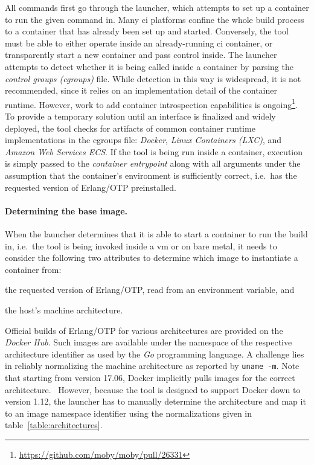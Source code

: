 All commands first go through the launcher, which attempts to set up a container to run the given command in. Many \acrshort{ci} platforms confine the whole build process to a container that has already been set up and started. Conversely, the tool must be able to either operate inside an already-running \acrshort{ci} container, or transparently start a new container and pass control inside. The launcher attempts to detect whether it is being called inside a container by parsing the \emph{control groups (cgroups)} file. While detection in this way is widespread, it is not recommended, since it relies on an implementation detail of the container runtime. However, work to add container introspection capabilities is ongoing\footnote{\url{https://github.com/moby/moby/pull/26331}}. To provide a temporary solution until an interface is finalized and widely deployed, the tool checks for artifacts of common container runtime implementations in the cgroups file: \emph{Docker}, \emph{Linux Containers (LXC)}, and \emph{Amazon Web Services ECS}. If the tool is being run inside a container, execution is simply passed to the \emph{container entrypoint} along with all arguments under the assumption that the container's environment is sufficiently correct, i.e.~has the requested version of Erlang/OTP preinstalled.

\paragraph{Determining the base image.} When the launcher determines that it is able to start a container to run the build in, i.e.~the tool is being invoked inside a \acrshort{vm} or on bare metal, it needs to consider the following two attributes to determine which image to instantiate a container from:
\begin{enumerate*}[label=(\roman*)]
  \item the requested version of Erlang/OTP, read from an environment variable, and
  \item the host's machine architecture.
\end{enumerate*}

Official builds of Erlang/OTP for various architectures are provided on the \emph{Docker Hub}. Such images are available under the namespace of the respective architecture identifier as used by the \emph{Go} programming language. A challenge lies in reliably normalizing the machine architecture as reported by \lstinline|uname -m|. Note that starting from version 17.06, Docker implicitly pulls images for the correct architecture.~\cite{docker:docs} However, because the tool is designed to support Docker down to version 1.12, the launcher has to manually determine the architecture and map it to an image namespace identifier using the normalizations given in table~\ref{table:architectures}.

